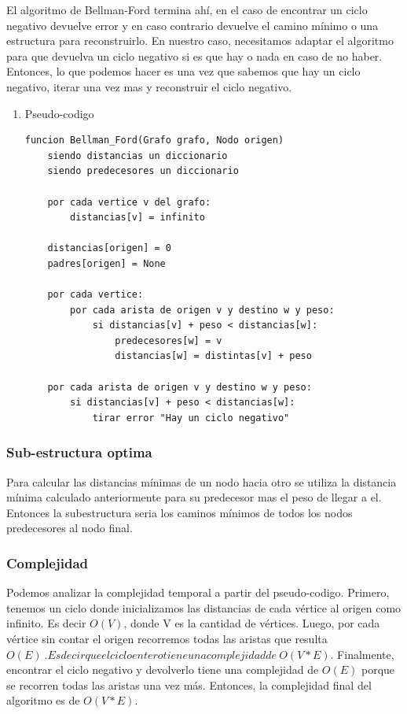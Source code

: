 \documentclass[titlepage,a4paper]{article}
\begin{document}
\hfill

El algoritmo de Bellman-Ford termina ahí, en el caso de encontrar un ciclo
negativo devuelve error y en caso contrario devuelve el camino mínimo o una
estructura para reconstruirlo. En nuestro caso, necesitamos adaptar el algoritmo
para que devuelva un ciclo negativo si es que hay o nada en caso de no haber.
Entonces, lo que podemos hacer es una vez que sabemos que hay un ciclo negativo,
iterar una vez mas y reconstruir el ciclo negativo.

\pagebreak

\begin{enumerate}
\item Pseudo-codigo
\label{sec:orge73f3d6}

\begin{verbatim}
funcion Bellman_Ford(Grafo grafo, Nodo origen)
    siendo distancias un diccionario
    siendo predecesores un diccionario

    por cada vertice v del grafo:
        distancias[v] = infinito

    distancias[origen] = 0
    padres[origen] = None

    por cada vertice:
        por cada arista de origen v y destino w y peso:
            si distancias[v] + peso < distancias[w]:
                predecesores[w] = v
                distancias[w] = distintas[v] + peso

    por cada arista de origen v y destino w y peso:
        si distancias[v] + peso < distancias[w]:
            tirar error "Hay un ciclo negativo"
\end{verbatim}
\end{enumerate}

\subsubsection{Sub-estructura optima}
\label{sec:org06bc752}

Para calcular las distancias mínimas de un nodo hacia otro se utiliza la
distancia mínima calculado anteriormente para su predecesor mas el peso de
llegar a el. Entonces la subestructura seria los caminos mínimos de todos los
nodos predecesores al nodo final.

\subsubsection{Complejidad}
\label{sec:org8e802df}

Podemos analizar la complejidad temporal a partir del pseudo-codigo. Primero,
tenemos un ciclo donde inicializamos las distancias de cada vértice al origen
como infinito. Es decir \(O(V)\), donde V es la cantidad de vértices. Luego, por
cada vértice sin contar el origen recorremos todas las aristas que resulta
\(O(E)~. Es decir que el ciclo entero tiene una complejidad de ~O(V * E)\).
Finalmente, encontrar el ciclo negativo y devolverlo tiene una complejidad de
\(O(E)\) porque se recorren todas las aristas una vez más.  Entonces, la
complejidad final del algoritmo es de \(O(V * E)\).
\end{document}
